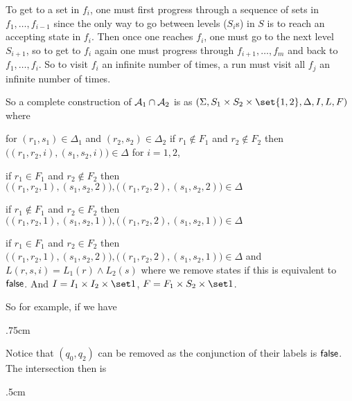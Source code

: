 To get to a set in $f_i$, one must first progress through a sequence of sets in $f_1,\dots,f_{i-1}$ since the only way to go between levels ($S_i$s) in $S$ is to reach an accepting state in $f_i$.
Then once one reaches $f_i$, one must go to the next level $S_{i+1}$, so to get to $f_i$ again one must progress through $f_{i+1},\dots,f_m$ and back to $f_1,\dots,f_i$.
So to visit $f_i$ an infinite number of times, a run must visit all $f_j$ an infinite number of times.

So a complete construction of ${\cal A}_1\cap{\cal A}_2$ is as $(\Sigma,S_1\times S_2\times\set{1,2},\Delta,I,L,F)$ where
\benum
    \item for $(r_1,s_1)\in\Delta_1$ and $(r_2,s_2)\in\Delta_2$ if $r_1\notin F_1$ and $r_2\notin F_2$ then $\bigl((r_1,r_2,i),(s_1,s_2,i)\bigr)\in\Delta$ for $i=1,2$,
    \item if $r_1\in F_1$ and $r_2\notin F_2$ then $\bigl((r_1,r_2,1),(s_1,s_2,2)\bigr),\bigl((r_1,r_2,2),(s_1,s_2,2)\bigr)\in\Delta$
    \item if $r_1\notin F_1$ and $r_2\in F_2$ then $\bigl((r_1,r_2,1),(s_1,s_2,1)\bigr),\bigl((r_1,r_2,2),(s_1,s_2,1)\bigr)\in\Delta$
    \item if $r_1\in F_1$ and $r_2\in F_2$ then $\bigl((r_1,r_2,1),(s_1,s_2,2)\bigr),\bigl((r_1,r_2,2),(s_1,s_2,1)\bigr)\in\Delta$
\eenum
and $L(r,s,i)=L_1(r)\land L_2(s)$ where we remove states if this is equivalent to ${\sf false}$.
And $I=I_1\times I_2\times\set 1$, $F=F_1\times S_2\times\set1$.

So for example, if we have

\kern.75cm
\centerline{
\kern5cm
}

Notice that $(q_0,q_2)$ can be removed as the conjunction of their labels is ${\sf false}$.
The intersection then is

\kern.5cm
\centerline{
}
\bigskip


